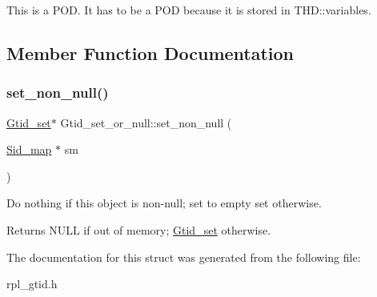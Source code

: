 This is a P\+OD. It has to be a P\+OD because it is stored in T\+H\+D\+::variables. 

\subsection{Member Function Documentation}
\mbox{\label{structGtid__set__or__null_a3a7015e462a30aad90c33e58c99a68c4}} 
\subsubsection{\texorpdfstring{set\+\_\+non\+\_\+null()}{set\_non\_null()}}
{\footnotesize\ttfamily \mbox{\hyperlink{classGtid__set}{Gtid\+\_\+set}}$\ast$ Gtid\+\_\+set\+\_\+or\+\_\+null\+::set\+\_\+non\+\_\+null (\begin{DoxyParamCaption}\item[{\mbox{\hyperlink{classSid__map}{Sid\+\_\+map}} $\ast$}]{sm }\end{DoxyParamCaption})\hspace{0.3cm}{\ttfamily [inline]}}

Do nothing if this object is non-\/null; set to empty set otherwise.

\begin{DoxyReturn}{Returns}
N\+U\+LL if out of memory; \mbox{\hyperlink{classGtid__set}{Gtid\+\_\+set}} otherwise. 
\end{DoxyReturn}


The documentation for this struct was generated from the following file\+:\begin{DoxyCompactItemize}
\item 
rpl\+\_\+gtid.\+h\end{DoxyCompactItemize}
